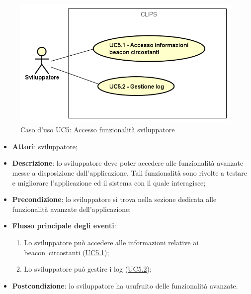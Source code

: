 \documentclass[../AnalisiDeiRequisiti.tex]{subfiles}
\begin{document}
        \begin{figure}[!h]
            \centering
            \includegraphics[scale=0.95, width=\textwidth]{img/UC5.png}
            \caption{Caso d'uso UC5: Accesso funzionalità sviluppatore}\label{fig:UC5} 
        \end{figure}
\begin{itemize}
\item \textbf{Attori}: sviluppatore;
\item \textbf{Descrizione}: lo sviluppatore deve poter accedere alle funzionalità avanzate messe a disposizione dall'applicazione. Tali funzionalità sono rivolte a testare e migliorare l'applicazione ed il sistema con il quale interagisce; 
      \item \textbf{Precondizione}: lo sviluppatore si trova nella sezione dedicata alle funzionalità avanzate dell'applicazione;

        \item \textbf{Flusso principale degli eventi}:
          \begin{enumerate}
          \item Lo sviluppatore può accedere alle informazioni relative ai beacon\g\ circostanti (\hyperlink{UC5.1}{UC5.1});
          \item Lo sviluppatore può gestire i log (\hyperlink{UC5.2}{UC5.2});

      \end{enumerate}
    \item \textbf{Postcondizione}: lo sviluppatore ha usufruito delle funzionalità avanzate.
  \end{itemize}
\hypertarget{UC5.1}{}
\end{document}
